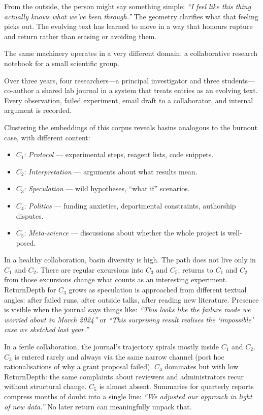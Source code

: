 From the outside, the person might say something simple: \emph{``I feel like this thing actually knows what we've been through.''} The geometry clarifies what that feeling picks out. The evolving text has learned to move in a way that honours rupture and return rather than erasing or avoiding them.

The same machinery operates in a very different domain: a collaborative research notebook for a small scientific group.

Over three years, four researchers---a principal investigator and three students---co-author a shared lab journal in a system that treats entries as an evolving text. Every observation, failed experiment, email draft to a collaborator, and internal argument is recorded.

Clustering the embeddings of this corpus reveals basins analogous to the burnout case, with different content:

\begin{itemize}
  \item $C_1$: \emph{Protocol} --- experimental steps, reagent lists, code snippets.
  \item $C_2$: \emph{Interpretation} --- arguments about what results mean.
  \item $C_3$: \emph{Speculation} --- wild hypotheses, ``what if'' scenarios.
  \item $C_4$: \emph{Politics} --- funding anxieties, departmental constraints, authorship disputes.
  \item $C_5$: \emph{Meta-science} --- discussions about whether the whole project is well-posed.
\end{itemize}

In a healthy collaboration, basin diversity is high. The path does not live only in $C_1$ and $C_2$. There are regular excursions into $C_3$ and $C_5$; returns to $C_1$ and $C_2$ from those excursions change what counts as an interesting experiment. ReturnDepth for $C_3$ grows as speculation is approached from different textual angles: after failed runs, after outside talks, after reading new literature. Presence is visible when the journal says things like: \emph{``This looks like the failure mode we worried about in March 2024''} or \emph{``This surprising result realises the `impossible' case we sketched last year.''}

In a ferile collaboration, the journal's trajectory spirals mostly inside $C_1$ and $C_2$. $C_3$ is entered rarely and always via the same narrow channel (post hoc rationalisations of why a grant proposal failed). $C_4$ dominates but with low ReturnDepth: the same complaints about reviewers and administrators recur without structural change. $C_5$ is almost absent. Summaries for quarterly reports compress months of doubt into a single line: \emph{``We adjusted our approach in light of new data.''} No later return can meaningfully unpack that.

